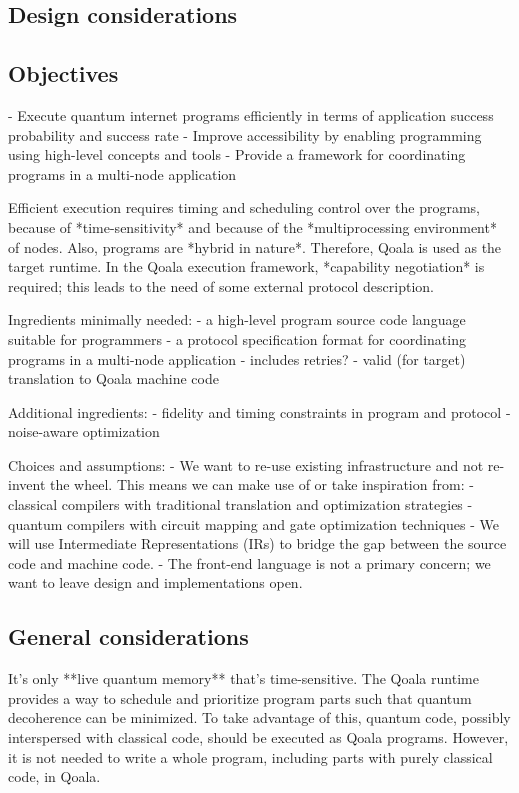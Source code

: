 
\subsection{Design considerations}

\subsection{Objectives}
- Execute quantum internet programs efficiently in terms of application success probability and success rate
- Improve accessibility by enabling programming using high-level concepts and tools
- Provide a framework for coordinating programs in a multi-node application

Efficient execution requires timing and scheduling control over the programs, because of *time-sensitivity* and because of the *multiprocessing environment* of nodes.
Also, programs are *hybrid in nature*.
Therefore, Qoala is used as the target runtime.
In the Qoala execution framework, *capability negotiation* is required; this leads to the need of some external protocol description.


Ingredients minimally needed:
- a high-level program source code language suitable for programmers
- a protocol specification format for coordinating programs in a multi-node application
  - includes retries?
- valid (for target) translation to Qoala machine code

Additional ingredients:
- fidelity and timing constraints in program and protocol
- noise-aware optimization


Choices and assumptions:
- We want to re-use existing infrastructure and not re-invent the wheel. This means we can make use of or take inspiration from:
  - classical compilers with traditional translation and optimization strategies
  - quantum compilers with circuit mapping and gate optimization techniques
- We will use Intermediate Representations (IRs) to bridge the gap between the source code and machine code.
- The front-end language is not a primary concern; we want to leave design and implementations open.

\subsection{General considerations}
It's only **live quantum memory** that's time-sensitive.
The Qoala runtime provides a way to schedule and prioritize program parts such that quantum decoherence can be minimized.
To take advantage of this, quantum code, possibly interspersed with classical code, should be executed as Qoala programs.
However, it is not needed to write a whole program, including parts with purely classical code, in Qoala.


